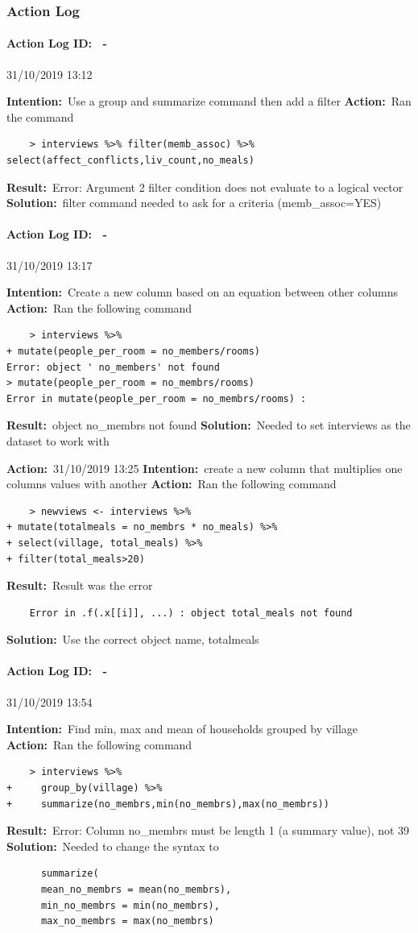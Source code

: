 \documentclass[12pt]{article}
\newcounter{problem} \setcounter{problem}{1}
\newcommand{\actionlog}[1]{\paragraph{Action Log ID: \theproblem\ -}{#1} ~\\ \addtocounter{problem}{1}}
\newcommand{\intention}[1]{\textbf{Intention:}{\textnormal\ #1} \newline}
\newcommand{\action}[1]{\textbf{Action:}{\textnormal\ #1} \newline}
\newcommand{\result}[1]{\textbf{Result:}{\textnormal\ #1} \newline}
\newcommand{\solution}[1]{\textbf{Solution:}{\textnormal\ #1} \newline}
\begin{document}
\subsubsection{Action Log}

\actionlog{31/10/2019 13:12}
\intention{Use a group and summarize command then add a filter}
\action{Ran the command}
\begin{verbatim}
    > interviews %>% filter(memb_assoc) %>% select(affect_conflicts,liv_count,no_meals) 
\end{verbatim}
\result{Error: Argument 2 filter condition does not evaluate to a logical vector}
\solution{filter command needed to ask for a criteria (memb\_assoc=YES)}

\actionlog{31/10/2019 13:17}
\intention{Create a new column based on an equation between other columns}
\action{Ran the following command}
\begin{verbatim}
    > interviews %>% 
+ mutate(people_per_room = no_members/rooms)
Error: object ' no_members' not found
> mutate(people_per_room = no_membrs/rooms)
Error in mutate(people_per_room = no_membrs/rooms) :
\end{verbatim}
\result{object no\_membrs not found}
\solution{Needed to set interviews as the dataset to work with}

\action{31/10/2019 13:25}
\intention{create a new column that multiplies one columns values with another}
\action{Ran the following command}
\begin{verbatim}
    > newviews <- interviews %>% 
+ mutate(totalmeals = no_membrs * no_meals) %>% 
+ select(village, total_meals) %>% 
+ filter(total_meals>20)
\end{verbatim}
\result{Result was the error}
\begin{verbatim}
    Error in .f(.x[[i]], ...) : object total_meals not found
\end{verbatim}
\solution{Use the correct object name, totalmeals}

\actionlog{31/10/2019 13:54}
\intention{Find min, max and mean of households grouped by village}
\action{Ran the following command}
\begin{verbatim}
    > interviews %>% 
+     group_by(village) %>% 
+     summarize(no_membrs,min(no_membrs),max(no_membrs))
\end{verbatim}
\result{Error: Column no\_membrs must be length 1 (a summary value), not 39}
\solution{Needed to change the syntax to}
\begin{verbatim}
      summarize(
      mean_no_membrs = mean(no_membrs),
      min_no_membrs = min(no_membrs),
      max_no_membrs = max(no_membrs)
\end{verbatim}
\end{document}
